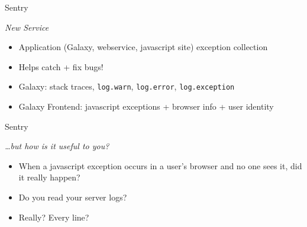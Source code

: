 \documentclass[12pt]{ufrslides}
\begin{document}
	\begin{frame}{Sentry}
		\begin{center}
			\emph{New Service}
		\end{center}
		\begin{itemize}
			\item Application (Galaxy, webservice, javascript site) exception collection
			\item Helps catch + fix bugs!
			\item Galaxy: stack traces, \texttt{log.warn}, \texttt{log.error}, \texttt{log.exception}
			\item Galaxy Frontend: javascript exceptions + browser info + user identity
		\end{itemize}
	\end{frame}


	{%
		\begin{frame}[plain]
		\end{frame}
	}

	{%
		\begin{frame}[plain]
		\end{frame}
	}

	{%
		\begin{frame}[plain]
		\end{frame}
	}

	\begin{frame}{Sentry}
		\begin{center}
			\emph{\ldots{}but how is it useful to you?}
		\end{center}
		\begin{itemize}
			\item When a javascript exception occurs in a user's browser and no one sees it, did it really happen?
			\item Do you read your server logs?
			\item Really? Every line?
		\end{itemize}
	\end{frame}
\end{document}
